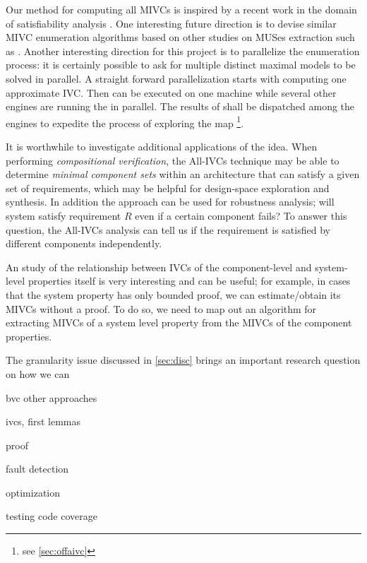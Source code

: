 
Our method for computing all MIVCs is inspired by a recent work in the domain of satisfiability analysis \cite{marco2016fast}. One interesting future direction is to devise similar MIVC enumeration algorithms based on other studies on MUSes extraction such as \cite{nadel2014accelerated}.
Another interesting direction for this project is to parallelize the enumeration process: it is certainly possible to ask for multiple distinct maximal models to be solved in parallel. 
A straight forward parallelization starts with computing one approximate IVC. Then \mustalg can be executed on one machine while several other engines are running the \aivcalg in parallel. The results of \mustalg shall be dispatched among the engines to expedite the process of exploring the map \footnote{see \ref{sec:offaivc}}.

It is worthwhile to investigate additional applications of the idea.  When performing {\em compositional verification}, the All-IVCs technique may be able to determine {\em minimal component sets} within an architecture that can satisfy a given set of requirements, which may be helpful for design-space exploration and synthesis. In addition the approach can be used for robustness analysis; will system satisfy requirement $R$ even if a certain component fails? To answer this question, the All-IVCs analysis can tell us if the requirement is satisfied by different components independently. 


An study of the relationship between IVCs of the component-level and system-level properties itself is very interesting and can be useful; for example, in cases that the system property has only bounded proof, we can estimate/obtain its MIVCs without a proof. To do so, we need to map out an algorithm for extracting MIVCs of a system level property from the MIVCs of the component properties.

The granularity issue discussed in \ref{sec:disc} brings an important research question on how we can 

bvc other approaches

ivcs, first lemmas

proof

fault detection

optimization

testing code coverage
